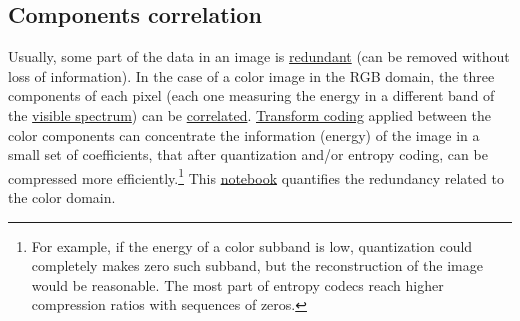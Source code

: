 \subsection{Components correlation}

Usually, some part of the data in an image is
\href{https://en.wikipedia.org/wiki/Data_redundancy}{redundant} (can
be removed without loss of information). In the case of a color image
in the RGB domain, the three components of each pixel (each one
measuring the energy in a different band of the
\href{https://en.wikipedia.org/wiki/Visible_spectrum}{visible
  spectrum}) can be
\href{https://en.wikipedia.org/wiki/Correlation_and_dependence}{correlated}.
\href{https://vicente-gonzalez-ruiz.github.io/transform_coding/}{Transform
  coding} applied between the color components can concentrate the
information (energy) of the image in a small set of coefficients, that
after quantization and/or entropy coding, can be compressed more
efficiently.\footnote{For example, if the energy of a color subband is
low, quantization could completely makes zero such subband, but the
reconstruction of the image would be reasonable. The most part of
entropy codecs reach higher compression ratios with sequences of
zeros.} This
\href{https://github.com/Sistemas-Multimedia/Sistemas-Multimedia.github.io/blob/master/milestones/06-YUV_compression/color_redundancy.ipynb}{notebook}
quantifies the redundancy related to the color domain.

\begin{comment}
To estimate the
\href{https://en.wikipedia.org/wiki/Redundancy_(information_theory)}{redundancy}
we have basically two options:
\begin{enumerate}
\item Compute the
  \href{https://en.wikipedia.org/wiki/Entropy_(information_theory)}{0-order
    (memoryless source) entropy} of the signal: the higher the
  entropy, the lower the redudancy. In fact, if we suppose that the
  samples of the signal are uncorrelated, the 0-order entropy is an
  exact measure of the expected bit-rate achieved by an
  \href{https://en.wikipedia.org/wiki/Arithmetic_coding}{arithmetic
    encoder} (the most efficient entropy compressor). Unfortunately,
  the 0-order entropy is usually only a estimation of the redundancy,
  i.e., lower bit-rates can be achieved in practice after using a high-order
  decorrelation.
\item A better way is to use an
  \href{https://en.wikipedia.org/wiki/Data_compression}{lossless
    compressor}: the higher the length of the compressed file compared
  to the length of the original file, the lower the
  redundancy.\footnote{If the length of the compressed file is equal or
  larger than the length of the original file, then, for the compressor
  that we are using, there is not redundancy in the original
  representation.} Notice, however, that although this estimation is
  more accurate than the 0-order entropy, in general, it depends on the
  compressor (different algoritms can provide different
  estimations).
\end{enumerate}
\end{comment}

